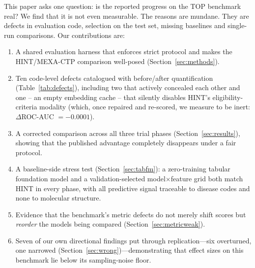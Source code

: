 \documentclass[a4paper,fleqn]{cas-sc}
\begin{document}
This paper asks one question: is the reported progress on the TOP benchmark real? We find that it
is not even measurable. The reasons are mundane. They are defects in evaluation code, selection on
the test set, missing baselines and single-run comparisons. Our contributions are:
\begin{enumerate}
  \item A shared evaluation harness that enforces strict protocol and makes the HINT/MEXA-CTP comparison well-posed (Section~\ref{sec:methods}).
  \item Ten code-level defects catalogued with before/after quantification (Table~\ref{tab:defects}), including two that actively concealed each other and one -- an empty embedding cache -- that silently disables HINT's eligibility-criteria modality (which, once repaired and re-scored, we measure to be inert: $\Delta$ROC-AUC $=-0.0001$).
  \item A corrected comparison across all three trial phases (Section~\ref{sec:results}), showing that the published advantage completely disappears under a fair protocol.
  \item A baseline-side stress test (Section~\ref{sec:tabfm}): a zero-training tabular foundation model and a validation-selected model$\times$feature grid both match HINT in every phase, with all predictive signal traceable to disease codes and none to molecular structure.
  \item Evidence that the benchmark's metric defects do not merely shift scores but \emph{reorder} the models being compared (Section~\ref{sec:metricweak}).
  \item Seven of our own directional findings put through replication---six overturned, one narrowed (Section~\ref{sec:wrong})---demonstrating that effect sizes on this benchmark lie below its sampling-noise floor.
\end{enumerate}
\end{document}
